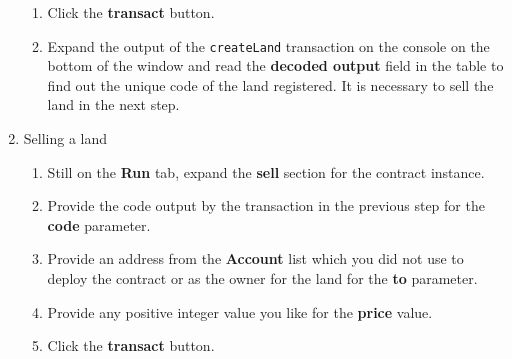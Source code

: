 \documentclass[10pt,twoside,a4]{scrartcl}%
\begin{document}
\begin{enumerate}
\begin{enumerate}
        \item Click the \textbf{transact} button.
        \item Expand the output of the \texttt{createLand} transaction on the console on the bottom of the window and read the \textbf{decoded output} field in the table to find out the unique code of the land registered. It is necessary to sell the land in the next step.
    \end{enumerate}
    \item Selling a land
    \begin{enumerate}
        \item Still on the \textbf{Run} tab, expand the \textbf{sell} section for the contract instance.
        \item Provide the code output by the transaction in the previous step for the \textbf{code} parameter.
        \item Provide an address from the \textbf{Account} list which you did not use to deploy the contract or as the owner for the land for the \textbf{to} parameter.
        \item Provide any positive integer value you like for the \textbf{price} value.
        \item Click the \textbf{transact} button.
    \end{enumerate}%
\end{enumerate}%
\end{document}
